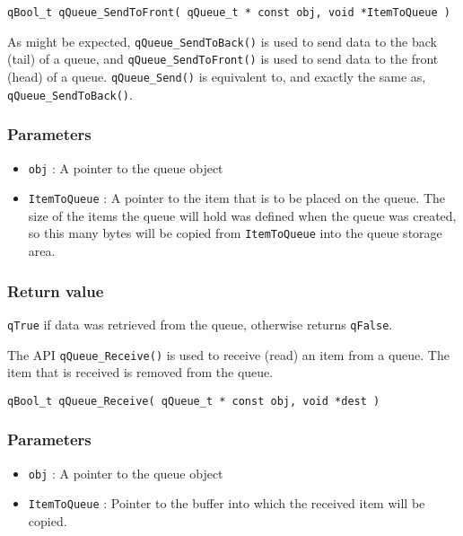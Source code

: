 \begin{lstlisting}[style=CStyle]
qBool_t qQueue_SendToFront( qQueue_t * const obj, void *ItemToQueue )
\end{lstlisting}

As might be expected, \lstinline{qQueue_SendToBack()} is used to send data to the back (tail) of a queue, and \lstinline{qQueue_SendToFront()} is used to send data to the front (head) of a queue. \lstinline{qQueue_Send()}  is equivalent to, and exactly the same as, \lstinline{qQueue_SendToBack()}.

\subsubsection*{Parameters}
\begin{itemize}
    \item \lstinline{obj} : A pointer to the queue object
    \item \lstinline{ItemToQueue} : A pointer to the item that is to be placed on the queue. The size of the items the queue will hold was defined when the queue was created, so this many bytes will be copied from \lstinline{ItemToQueue} into the queue storage area. 
\end{itemize}  

\subsubsection*{Return value}
\lstinline{qTrue} if data was retrieved from the queue, otherwise returns \lstinline{qFalse}.

\noindent\hrulefill  

The API \lstinline{qQueue_Receive()}  is used to receive (read) an item from a queue. The item that is received is removed from the queue. 
\medskip

\begin{lstlisting}[style=CStyle]
qBool_t qQueue_Receive( qQueue_t * const obj, void *dest )
\end{lstlisting}

\subsubsection*{Parameters}
\begin{itemize}
    \item \lstinline{obj} : A pointer to the queue object
    \item \lstinline{ItemToQueue} : Pointer to the buffer into which the received item will be copied.
\end{itemize}  

